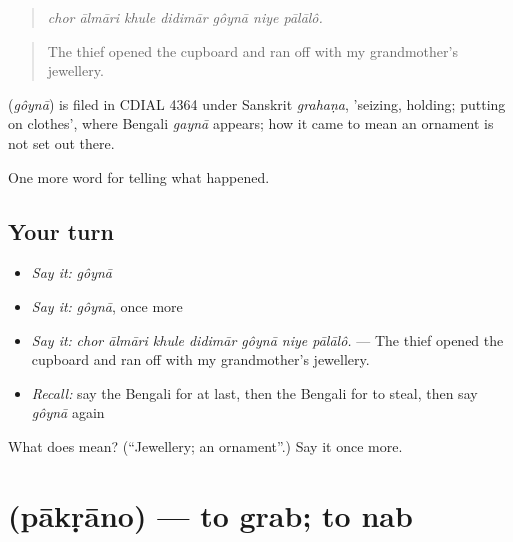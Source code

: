 \begin{quote}
      
\end{quote}

\begin{quote}
\emph{chor ālmāri khule didimār gôynā niye pālālô.}
\end{quote}

\begin{quote}
The thief opened the cupboard and ran off with my grandmother's jewellery.
\end{quote}

\begin{cousinweb}
\textbf{} (\emph{gôynā}) is filed in CDIAL 4364 under Sanskrit \emph{grahaṇa}, 'seizing, holding; putting on clothes', where Bengali \emph{gaynā} appears; how it came to mean an ornament is not set out there.
\end{cousinweb}

\begin{grammarlens}[title={What you've built}]
One more word for telling what happened.
\end{grammarlens}

\subsection*{Your turn}
\begin{itemize}
\raggedright
  \item \emph{Say it:} \emph{gôynā}
  \item \emph{Say it:} \emph{gôynā}, once more
  \item \emph{Say it:} \emph{chor ālmāri khule didimār gôynā niye pālālô.} — The thief opened the cupboard and ran off with my grandmother's jewellery.
  \item \emph{Recall:} say the Bengali for at last, then the Bengali for to steal, then say \emph{gôynā} again
\end{itemize}

\begin{tcolorbox}[breakable,colback=teal!4,colframe=teal!35!black,title={Before you move on}]
What does  mean? (\textquotedblleft{}Jewellery; an ornament\textquotedblright{}.) Say it once more.
\end{tcolorbox}
\section[\texorpdfstring{\bn{পাকড়ানো} (pākṛāno)}{পাকড়ানো (pākṛāno)}]{ (pākṛāno) — to grab; to nab}

